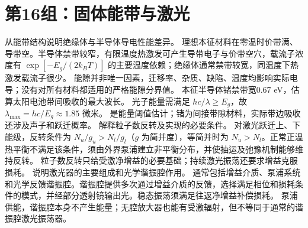 \section{第16组：固体能带与激光}
\problemtext 从能带结构说明绝缘体与半导体导电性能差异。
\workings 理想本征材料在零温时价带满、导带空。半导体禁带较窄，有限温度热激发可产生导带电子与价带空穴，载流子浓度有 $\exp[-E_g/(2k_BT)]$ 的主要温度依赖；绝缘体通常禁带较宽，同温度下热激发载流子很少。
\crosscheck 能隙并非唯一因素，迁移率、杂质、缺陷、温度均影响实际电导；没有对所有材料都适用的严格能隙分界值。
\problemtext 本征半导体锗禁带宽0.67 eV，估算太阳电池带间吸收的最大波长。
\workings 光子能量需满足 $hc/\lambda\ge E_g$，故 $\lambda_{\max}=hc/E_g\approx1.85$ 微米。
\crosscheck 是能量阈值估计；锗为间接带隙材料，实际带边吸收还涉及声子和跃迁概率。
\problemtext 解释粒子数反转及实现的必要条件。
\workings 对激光跃迁上、下能级，反转条件为 $N_u/g_u>N_l/g_l$（$g$ 为简并度），等简并时为 $N_u>N_l$。正常正温热平衡不满足该条件，须由外界泵浦建立非平衡分布，并使抽运及弛豫机制能够维持反转。
\crosscheck 粒子数反转只给受激净增益的必要基础；持续激光振荡还要求增益克服损耗。
\problemtext 说明激光器的主要组成和光学谐振腔作用。
\workings 通常包括增益介质、泵浦系统和光学反馈谐振腔。谐振腔提供多次通过增益介质的反馈，选择满足相位和损耗条件的模式，并经部分透射镜输出光。稳态振荡须满足往返净增益补偿损耗。
\crosscheck 泵浦供能，谐振腔本身不产生能量；无腔放大器也能有受激辐射，但不等同于通常的谐振腔激光振荡器。
